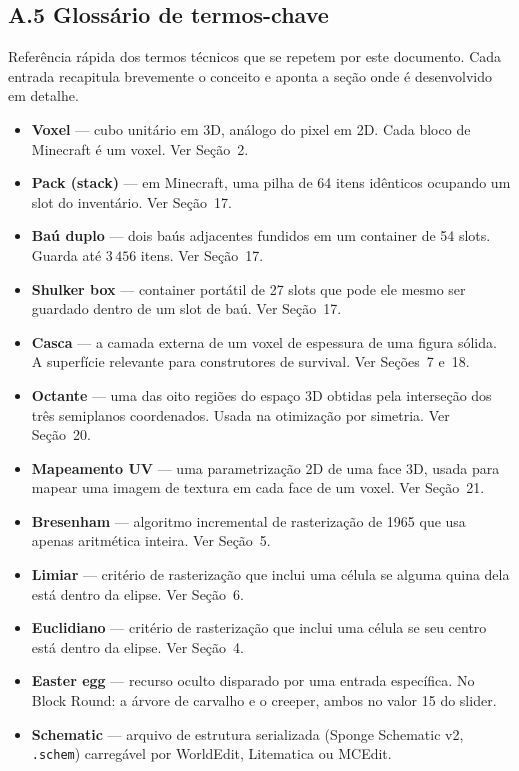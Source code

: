 \documentclass[12pt,a4paper]{scrartcl}
\newcommand{\code}[1]{\texttt{\small #1}}
\begin{document}
\subsection*{A.5 Glossário de termos-chave}

Referência rápida dos termos técnicos que se repetem por este documento. Cada entrada recapitula brevemente o conceito e aponta a seção onde é desenvolvido em detalhe.

\begin{itemize}[leftmargin=1.4em,itemsep=0.18em,topsep=0.3em]
  \item \textbf{Voxel} --- cubo unitário em 3D, análogo do pixel em 2D. Cada bloco de Minecraft é um voxel. Ver Seção~2.
  \item \textbf{Pack (stack)} --- em Minecraft, uma pilha de 64 itens idênticos ocupando um slot do inventário. Ver Seção~17.
  \item \textbf{Baú duplo} --- dois baús adjacentes fundidos em um container de 54 slots. Guarda até $3\,456$ itens. Ver Seção~17.
  \item \textbf{Shulker box} --- container portátil de 27 slots que pode ele mesmo ser guardado dentro de um slot de baú. Ver Seção~17.
  \item \textbf{Casca} --- a camada externa de um voxel de espessura de uma figura sólida. A superfície relevante para construtores de survival. Ver Seções~7 e~18.
  \item \textbf{Octante} --- uma das oito regiões do espaço 3D obtidas pela interseção dos três semiplanos coordenados. Usada na otimização por simetria. Ver Seção~20.
  \item \textbf{Mapeamento UV} --- uma parametrização 2D de uma face 3D, usada para mapear uma imagem de textura em cada face de um voxel. Ver Seção~21.
  \item \textbf{Bresenham} --- algoritmo incremental de rasterização de 1965 que usa apenas aritmética inteira. Ver Seção~5.
  \item \textbf{Limiar} --- critério de rasterização que inclui uma célula se alguma quina dela está dentro da elipse. Ver Seção~6.
  \item \textbf{Euclidiano} --- critério de rasterização que inclui uma célula se seu centro está dentro da elipse. Ver Seção~4.
  \item \textbf{Easter egg} --- recurso oculto disparado por uma entrada específica. No Block Round: a árvore de carvalho e o creeper, ambos no valor 15 do slider.
  \item \textbf{Schematic} --- arquivo de estrutura serializada (Sponge Schematic v2, \code{.schem}) carregável por WorldEdit, Litematica ou MCEdit.
\end{itemize}
\end{document}
